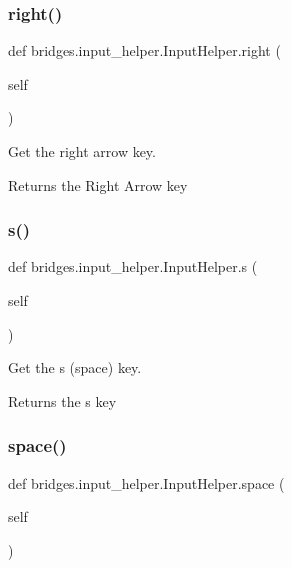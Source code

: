\subsubsection{\texorpdfstring{right()}{right()}}
{\footnotesize\ttfamily def bridges.\+input\+\_\+helper.\+Input\+Helper.\+right (\begin{DoxyParamCaption}\item[{}]{self }\end{DoxyParamCaption})}



Get the right arrow key. 

\begin{DoxyReturn}{Returns}
the \textquotesingle{}Right Arrow\textquotesingle{} key 
\end{DoxyReturn}
\mbox{\label{classbridges_1_1input__helper_1_1_input_helper_a2b08296f9bfe269c481bca1e7a030a53}} 
\subsubsection{\texorpdfstring{s()}{s()}}
{\footnotesize\ttfamily def bridges.\+input\+\_\+helper.\+Input\+Helper.\+s (\begin{DoxyParamCaption}\item[{}]{self }\end{DoxyParamCaption})}



Get the \textquotesingle{}s\textquotesingle{} (space) key. 

\begin{DoxyReturn}{Returns}
the \textquotesingle{}s\textquotesingle{} key 
\end{DoxyReturn}
\mbox{\label{classbridges_1_1input__helper_1_1_input_helper_a765e389cd5becacf3880debf4678715b}} 
\subsubsection{\texorpdfstring{space()}{space()}}
{\footnotesize\ttfamily def bridges.\+input\+\_\+helper.\+Input\+Helper.\+space (\begin{DoxyParamCaption}\item[{}]{self }\end{DoxyParamCaption})}



